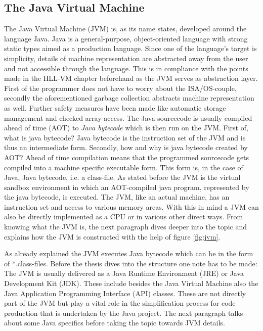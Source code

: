 \subsection{The Java Virtual Machine}
The Java Virtual Machine (JVM) is, as its name states, developed around the language Java. Java is a general-purpose, object-oriented language with strong static types aimed as a production language. \cite{Gosling} Since one of the language's target is simplicity, details of machine representation are abstracted away from the user and not accessible through the language. This is in compliance with the points made in the HLL-VM chapter beforehand as the JVM serves as abstraction layer. First of the programmer does not have to worry about the ISA/OS-couple, secondly the aforementioned garbage collection abstracts machine representation as well. Further safety measures have been made like automatic storage management and checked array access. The Java sourcecode is usually compiled ahead of time (AOT) to \emph{Java bytecode} which is then run on the JVM. First of, what is java bytecode? Java bytecode is the instruction set of the JVM and is thus an intermediate form. Secondly, how and why is java bytecode created by AOT? Ahead of time compilation means that the programmed sourcecode gets compiled into a machine specific executable form. This form is, in the case of Java, Java bytecode, i.e. a class-file.\cite{Gosling} As stated before the JVM is the virtual sandbox environment in which an AOT-compiled java program, represented by the java bytecode, is executed. The JVM, like an actual machine, has an instruction set and access to various memory areas. With this in mind a JVM can also be directly implemented as a CPU or in various other direct ways. From knowing what the JVM is, the next paragraph dives deeper into the topic and explains how the JVM is constructed with the help of figure \ref{fig:jvm}.

As already explained the JVM executes Java bytecode which can be in the form of *.class-files. Before the thesis dives into the structure one note has to be made: The JVM is usually delivered as a Java Runtime Environment (JRE) or Java Development Kit (JDK). These include besides the Java Virtual Machine also the Java Application Programming Interface (API) classes. These are not directly part of the JVM but play a vital role in the simplification process for code production that is undertaken by the Java project. The next paragraph talks about some Java specifics before taking the topic towards JVM details.

